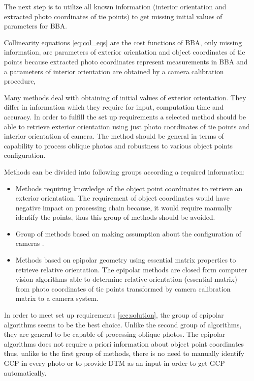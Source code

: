 \documentclass[a4paper,12pt]{article}
\begin{document}
The next step is to utilize all known information (interior orientation and extracted 
photo coordinates of tie points) to get missing initial values of parameters for BBA. 

Collinearity equations \eqref{eq:col_eqs} are the cost functions of BBA,
only missing information, 
are parameters of exterior orientation and object coordinates of 
tie points because 
extracted photo coordinates represent measurements in BBA and
a parameters of interior orientation are obtained by a camera calibration procedure,



Many methods deal with obtaining of initial values of exterior orientation. They 
differ in information which they require for input, computation time and accuracy. 
In order to fulfill the set up requirements a selected method should be able to retrieve exterior orientation 
using just photo coordinates of tie points and interior orientation of camera. The method 
should be general in terms of capability to process oblique photos and robustness to 
various object points configuration.

Methods can be divided into following groups according a required information:
\begin{itemize}
\item Methods requiring knowledge of the object point coordinates to retrieve an exterior
orientation. The requirement of object coordinates would have negative impact on processing 
chain because, it would require manually identify the points, thus 
this group of methods should be avoided. 
\item Group of  methods based on making assumption about the configuration of cameras \label{sec:assum}.  
\item Methods based on epipolar geometry using essential matrix properties to 
retrieve relative orientation.
The epipolar methods are closed form computer vision algorithms
able to determine relative orientation (essential matrix) from photo coordinates 
of tie points transformed by camera calibration matrix 
to a camera system. 
\end{itemize}

In order to meet set up requirements \ref{sec:solution}, the group of epipolar 
algorithms seems to be the best choice. Unlike the second group of algorithms,
they are general to be capable of processing oblique photos. The epipolar algorithms
does not require a priori information about object point coordinates thus, unlike
to the first group of methods,
there is no need to manually identify GCP in every photo or to provide  
DTM as an input in order to get GCP automatically.
\end{document}
